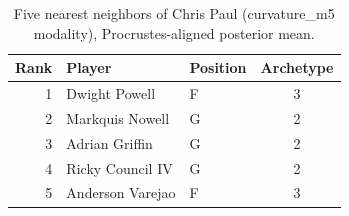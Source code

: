 \begin{table}[htbp]
  \centering\small
  \begin{tabular}{rllc}
    \toprule
    Rank & Player & Position & Archetype \\
    \midrule
    1 & Dwight Powell & F & 3 \\
    2 & Markquis Nowell & G & 2 \\
    3 & Adrian Griffin & G & 2 \\
    4 & Ricky Council IV & G & 2 \\
    5 & Anderson Varejao & F & 3 \\
    \bottomrule
  \end{tabular}
  \caption{Five nearest neighbors of Chris Paul (curvature_m5 modality), Procrustes-aligned posterior mean.}
  \label{tab:Chris_Paul_neighbors_curvature_m5}
\end{table}

